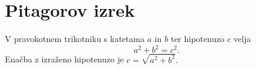\documentclass{article}
\begin{document}
\section*{Pitagorov izrek}
V pravokotnem trikotniku s katetama \(a\) in \(b\) ter hipotenuzo \(c\) velja
\[ a^2 + b^2 = c^2. \]
Enačba z izraženo hipotenuzo je \(c = \sqrt{a^2+b^2}.\)
\end{document}
